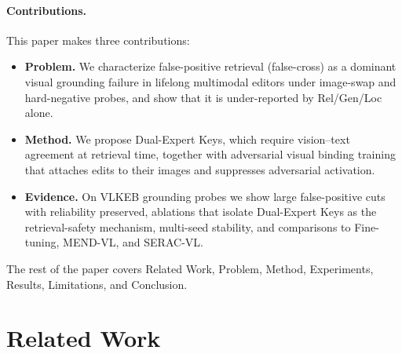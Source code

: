 \documentclass[letterpaper]{article} %
\begin{document}
\paragraph{Contributions.}
This paper makes three contributions:
\begin{itemize}
    \item \textbf{Problem.} We characterize false-positive retrieval (false-cross) as a dominant visual grounding failure in lifelong multimodal editors under image-swap and hard-negative probes, and show that it is under-reported by Rel/Gen/Loc alone.
    \item \textbf{Method.} We propose Dual-Expert Keys, which require vision--text agreement at retrieval time, together with adversarial visual binding training that attaches edits to their images and suppresses adversarial activation.
    \item \textbf{Evidence.} On VLKEB grounding probes we show large false-positive cuts with reliability preserved, ablations that isolate Dual-Expert Keys as the retrieval-safety mechanism, multi-seed stability, and comparisons to Fine-tuning, MEND-VL, and SERAC-VL.
\end{itemize}

The rest of the paper covers Related Work, Problem, Method, Experiments, Results, Limitations, and Conclusion.

\section{Related Work}
\label{sec:related}
\end{document}
